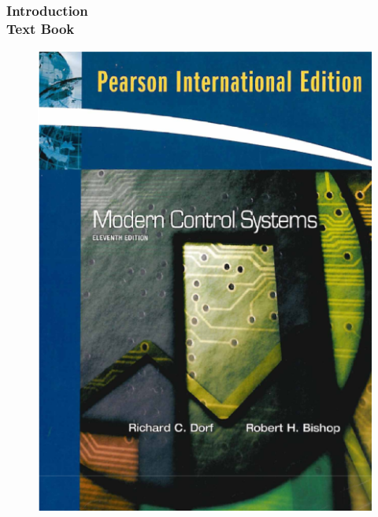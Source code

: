 \documentclass[hyperref={pdfpagelabels=true}]{beamer}
\begin{document}
\begin{frame}
\frametitle{Introduction \\ {\large Text Book}}
\begin{figure}[!tbp]
\centering
\includegraphics[scale = 0.35]{figs/Selection_009.png}
\end{figure}
\end{frame}
\end{document}
